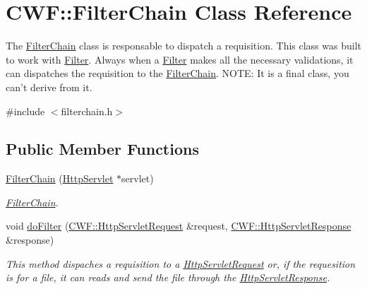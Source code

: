 \hypertarget{class_c_w_f_1_1_filter_chain}{\section{C\+W\+F\+:\+:Filter\+Chain Class Reference}
\label{class_c_w_f_1_1_filter_chain}
}


The \hyperlink{class_c_w_f_1_1_filter_chain}{Filter\+Chain} class is responsable to dispatch a requisition. This class was built to work with \hyperlink{class_c_w_f_1_1_filter}{Filter}. Always when a \hyperlink{class_c_w_f_1_1_filter}{Filter} makes all the necessary validations, it can dispatches the requisition to the \hyperlink{class_c_w_f_1_1_filter_chain}{Filter\+Chain}. N\+O\+T\+E\+: It is a final class, you can't derive from it.  




{\ttfamily \#include $<$filterchain.\+h$>$}

\subsection*{Public Member Functions}
\begin{DoxyCompactItemize}
\item 
\hyperlink{class_c_w_f_1_1_filter_chain_a2c108c6b3b588997381b6d861f2dd8b9}{Filter\+Chain} (\hyperlink{class_c_w_f_1_1_http_servlet}{Http\+Servlet} $\ast$servlet)
\begin{DoxyCompactList}\small\item\em \hyperlink{class_c_w_f_1_1_filter_chain}{Filter\+Chain}. \end{DoxyCompactList}\item 
void \hyperlink{class_c_w_f_1_1_filter_chain_a438bc63ea1fa575ae8882fb05a31feca}{do\+Filter} (\hyperlink{class_c_w_f_1_1_http_servlet_request}{C\+W\+F\+::\+Http\+Servlet\+Request} \&request, \hyperlink{class_c_w_f_1_1_http_servlet_response}{C\+W\+F\+::\+Http\+Servlet\+Response} \&response)
\begin{DoxyCompactList}\small\item\em This method dispaches a requisition to a \hyperlink{class_c_w_f_1_1_http_servlet_request}{Http\+Servlet\+Request} or, if the requesition is for a file, it can reads and send the file through the \hyperlink{class_c_w_f_1_1_http_servlet_response}{Http\+Servlet\+Response}. \end{DoxyCompactList}\end{DoxyCompactItemize}


